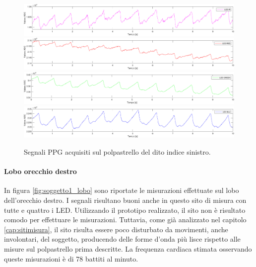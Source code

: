 \begin{figure}[h]
	\centering
	\includegraphics[width=1\linewidth]{ImageFiles/Misure Preliminari/Soggetto 1/polpastrello_ired}
	\includegraphics[width=1\linewidth]{ImageFiles/Misure Preliminari/Soggetto 1/polpastrello_red}
	\includegraphics[width=1\linewidth]{ImageFiles/Misure Preliminari/Soggetto 1/polpastrello_green}
	\includegraphics[width=1\linewidth]{ImageFiles/Misure Preliminari/Soggetto 1/polpastrello_blu}
	\caption{Segnali PPG acquisiti sul polpastrello del dito indice sinistro.}
	\label{fig:soggetto1_polpastrello}
\end{figure}

\clearpage

\paragraph{Lobo orecchio destro}

In figura \ref{fig:soggetto1_lobo} sono riportate le misurazioni effettuate sul lobo dell'orecchio destro. I segnali risultano buoni anche in questo sito di misura con tutte e quattro i LED. Utilizzando il prototipo realizzato, il sito non è risultato comodo per effettuare le misurazioni. Tuttavia, come già analizzato nel capitolo \ref{cap:sitimisura}, il sito risulta essere poco disturbato da movimenti, anche involontari, del soggetto, producendo delle forme d'onda più lisce rispetto alle misure sul polpastrello prima descritte. La frequenza cardiaca stimata osservando queste misurazioni è di 78 battiti al minuto.

